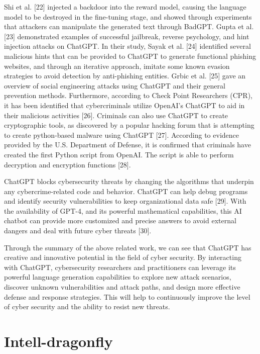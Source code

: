 \documentclass[runningheads]{llncs}
\begin{document}
%
Shi et al. [22] injected a backdoor into the reward model, causing the language model to be destroyed in the fine-tuning stage, and showed through experiments that attackers can manipulate the generated text through BadGPT. Gupta et al. [23] demonstrated examples of successful jailbreak, reverse psychology, and hint injection attacks on ChatGPT. In their study, Sayak et al. [24] identified several malicious hints that can be provided to ChatGPT to generate functional phishing websites, and through an iterative approach, imitate some known evasion strategies to avoid detection by anti-phishing entities. Grbic et al. [25] gave an overview of social engineering attacks using ChatGPT and their general prevention methods. Furthermore, according to Check Point Researchers (CPR), it has been identified that cybercriminals utilize OpenAI’s ChatGPT to aid in their malicious activities [26]. Criminals can also use ChatGPT to create cryptographic tools, as discovered by a popular hacking forum that is attempting to create python-based malware using ChatGPT [27]. According to evidence provided by the U.S. Department of Defense, it is confirmed that criminals have created the first Python script from OpenAI. The script is able to perform decryption and encryption functions [28].\par
%
ChatGPT blocks cybersecurity threats by changing the algorithms that underpin any cybercrime-related code and behavior. ChatGPT can help debug programs and identify security vulnerabilities to keep organizational data safe [29]. With the availability of GPT-4, and its powerful mathematical capabilities, this AI chatbot can provide more customized and precise answers to avoid external dangers and deal with future cyber threats [30].\par
%
Through the summary of the above related work, we can see that ChatGPT has creative and innovative potential in the field of cyber security. By interacting with ChatGPT, cybersecurity researchers and practitioners can leverage its powerful language generation capabilities to explore new attack scenarios, discover unknown vulnerabilities and attack paths, and design more effective defense and response strategies. This will help to continuously improve the level of cyber security and the ability to resist new threats.
%
\section{Intell-dragonfly}
\end{document}
